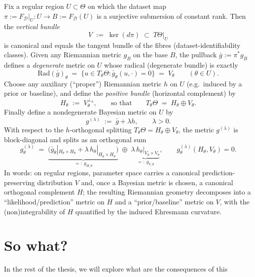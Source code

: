 Fix a regular region $U\subset\Theta$ on which the dataset map $\pi:=F_{\mathcal D}|_U:U\to B:=F_{\mathcal D}(U)$
is a surjective submersion of constant rank.  Then the \emph{vertical bundle}
\[
V \;:=\;\ker(d\pi)\;\subset\;T\Theta|_U
\]
is canonical and equals the tangent bundle of the fibres (dataset-identifiability classes).
Given any Riemannian metric $g_B$ on the base $B$, the pullback $\bar g:=\pi^\ast g_B$ defines a
\emph{degenerate} metric on $U$ whose radical (degenerate bundle) is exactly
\[
\mathrm{Rad}(\bar g)_\theta \;=\;\{u\in T_\theta\Theta:\bar g_\theta(u,\cdot)=0\}\;=\;V_\theta
\qquad(\theta\in U).
\]
Choose any auxiliary (``proper'') Riemannian metric $h$ on $U$ (e.g.\ induced by a prior or baseline),
and define the \emph{positive bundle} (horizontal complement) by
\[
H_\theta \;:=\; V_\theta^{\perp_h},
\qquad\text{so that}\qquad
T_\theta\Theta \;=\; H_\theta \oplus V_\theta.
\]
Finally define a nondegenerate Bayesian metric on $U$ by
\[
g^{(\lambda)} \;:=\; \bar g + \lambda h,
\qquad \lambda>0.
\]
With respect to the $h$-orthogonal splitting $T_\theta\Theta=H_\theta\oplus V_\theta$, the metric
$g^{(\lambda)}$ is block-diagonal and splits as an orthogonal sum
\[
g^{(\lambda)}_\theta
\;=\;
\underbrace{\bigl(\bar g_\theta|_{H_\theta\times H_\theta}+\lambda\,h_\theta|_{H_\theta\times H_\theta}\bigr)}_{=:~g_{H,\theta}}
\;\oplus\;
\underbrace{\lambda\,h_\theta|_{V_\theta\times V_\theta}}_{=:~g_{V,\theta}},
\qquad
g^{(\lambda)}_\theta(H_\theta,V_\theta)=0.
\]
In words: on regular regions, parameter space carries a canonical prediction-preserving distribution $V$
and, once a Bayesian metric is chosen, a canonical orthogonal complement $H$; the resulting Riemannian
geometry decomposes into a ``likelihood/prediction'' metric on $H$ and a ``prior/baseline'' metric on $V$,
with the (non)integrability of $H$ quantified by the induced Ehresmann curvature.
\section{So what?}
In the rest of the thesis, we will explore what are the consequences of this 